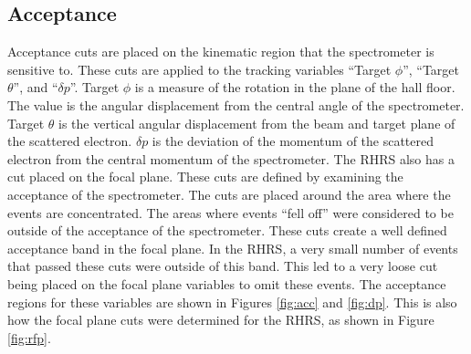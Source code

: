 \subsection{Acceptance}

Acceptance cuts are placed on the kinematic region that the spectrometer is sensitive to. These cuts are applied to the tracking variables ``Target $\phi$'', ``Target $\theta$'', and ``$\delta p$''. Target $\phi$ is a measure of the rotation in the plane of the hall floor. The value is the angular displacement from the central angle of the spectrometer. Target $\theta$ is the vertical angular displacement from the beam and target plane of the scattered electron. $\delta p$ is the deviation of the momentum of the scattered electron from the central momentum of the spectrometer. The RHRS also has a cut placed on the focal plane. These cuts are defined by examining the acceptance of the spectrometer. The cuts are placed around the area where the events are concentrated. The areas where events ``fell off'' were considered to be outside of the acceptance of the spectrometer. These cuts create a well defined acceptance band in the focal plane. In the RHRS, a very small number of events that passed these cuts were outside of this band. This led to a very loose cut being placed on the focal plane variables to omit these events. The acceptance regions for these variables are shown in Figures \ref{fig:acc} and \ref{fig:dp}. This is also how the focal plane cuts were determined for the RHRS, as shown in Figure \ref{fig:rfp}.

